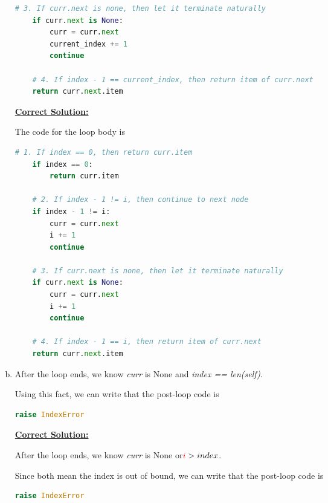 \documentclass[12pt]{article}
\begin{document}
\begin{enumerate}[a.]
\begin{lstlisting}[language=Python]
    # 3. If curr.next is none, then let it terminate naturally
    if curr.next is None:
        curr = curr.next
        current_index += 1
        continue

    # 4. If index - 1 == current_index, then return item of curr.next
    return curr.next.item
    \end{lstlisting}

    \newpage

    \begin{mdframed}
    \underline{\textbf{Correct Solution:}}

    \bigskip

    The code for the loop body is
    \begin{lstlisting}[language=Python]
    # 1. If index == 0, then return curr.item
    if index == 0:
        return curr.item

    # 2. If index - 1 != i, then continue to next node
    if index - 1 != i:
        curr = curr.next
        i += 1
        continue

    # 3. If curr.next is none, then let it terminate naturally
    if curr.next is None:
        curr = curr.next
        i += 1
        continue

    # 4. If index - 1 == i, then return item of curr.next
    return curr.next.item
    \end{lstlisting}
    \end{mdframed}

    \item

    After the loop ends, we know \textit{curr} is None and \textit{index == len(self)}.

    \bigskip

    Using this fact, we can write that the post-loop code is

    \begin{lstlisting}[language=Python]
    raise IndexError
    \end{lstlisting}

    \bigskip

    \begin{mdframed}
    \underline{\textbf{Correct Solution:}}

    \bigskip

    After the loop ends, we know \textit{curr} is None \color{red}or\color{black}\:$\color{red}i\color{black} > index$.

    \bigskip

    Since \color{red}both mean the index is out of bound\color{black}, we can write that the post-loop code is

    \begin{lstlisting}[language=Python]
    raise IndexError
    \end{lstlisting}
    \end{mdframed}


\end{enumerate}
\end{document}
